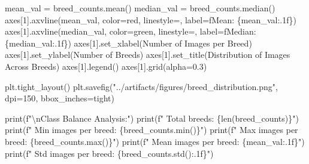 \documentclass[
  letterpaper,
  DIV=11,
  numbers=noendperiod]{scrartcl}
\newenvironment{Shaded}{\begin{snugshade}}{\end{snugshade}}
\newcommand{\BuiltInTok}[1]{\textcolor[rgb]{0.00,0.23,0.31}{#1}}
\newcommand{\CharTok}[1]{\textcolor[rgb]{0.13,0.47,0.30}{#1}}
\newcommand{\DecValTok}[1]{\textcolor[rgb]{0.68,0.00,0.00}{#1}}
\newcommand{\FloatTok}[1]{\textcolor[rgb]{0.68,0.00,0.00}{#1}}
\newcommand{\NormalTok}[1]{\textcolor[rgb]{0.00,0.23,0.31}{#1}}
\newcommand{\OperatorTok}[1]{\textcolor[rgb]{0.37,0.37,0.37}{#1}}
\newcommand{\SpecialCharTok}[1]{\textcolor[rgb]{0.37,0.37,0.37}{#1}}
\newcommand{\SpecialStringTok}[1]{\textcolor[rgb]{0.13,0.47,0.30}{#1}}
\newcommand{\StringTok}[1]{\textcolor[rgb]{0.13,0.47,0.30}{#1}}
\renewenvironment{Shaded}{%
  \begin{tcolorbox}[%
    enhanced,%
    colback=codebg,%
    colframe=codebg,%
    borderline west={3pt}{0pt}{sectionblue},%
    boxrule=0pt,%
    arc=0pt,%
    boxsep=5pt,%
    left=2mm,%
    right=2mm,%
    top=2mm,%
    bottom=2mm%
  ]%
}{%
  \end{tcolorbox}%
}
\begin{document}
\begin{Shaded}
\begin{Highlighting}[]
\NormalTok{mean\_val }\OperatorTok{=}\NormalTok{ breed\_counts.mean()}
\NormalTok{median\_val }\OperatorTok{=}\NormalTok{ breed\_counts.median()}
\NormalTok{axes[}\DecValTok{1}\NormalTok{].axvline(mean\_val, color}\OperatorTok{=}\StringTok{\textquotesingle{}red\textquotesingle{}}\NormalTok{, linestyle}\OperatorTok{=}\StringTok{\textquotesingle{}{-}{-}\textquotesingle{}}\NormalTok{,}
\NormalTok{                label}\OperatorTok{=}\SpecialStringTok{f\textquotesingle{}Mean: }\SpecialCharTok{\{}\NormalTok{mean\_val}\SpecialCharTok{:.1f\}}\SpecialStringTok{\textquotesingle{}}\NormalTok{)}
\NormalTok{axes[}\DecValTok{1}\NormalTok{].axvline(median\_val, color}\OperatorTok{=}\StringTok{\textquotesingle{}green\textquotesingle{}}\NormalTok{, linestyle}\OperatorTok{=}\StringTok{\textquotesingle{}{-}{-}\textquotesingle{}}\NormalTok{,}
\NormalTok{                label}\OperatorTok{=}\SpecialStringTok{f\textquotesingle{}Median: }\SpecialCharTok{\{}\NormalTok{median\_val}\SpecialCharTok{:.1f\}}\SpecialStringTok{\textquotesingle{}}\NormalTok{)}
\NormalTok{axes[}\DecValTok{1}\NormalTok{].set\_xlabel(}\StringTok{\textquotesingle{}Number of Images per Breed\textquotesingle{}}\NormalTok{)}
\NormalTok{axes[}\DecValTok{1}\NormalTok{].set\_ylabel(}\StringTok{\textquotesingle{}Number of Breeds\textquotesingle{}}\NormalTok{)}
\NormalTok{axes[}\DecValTok{1}\NormalTok{].set\_title(}\StringTok{\textquotesingle{}Distribution of Images Across Breeds\textquotesingle{}}\NormalTok{)}
\NormalTok{axes[}\DecValTok{1}\NormalTok{].legend()}
\NormalTok{axes[}\DecValTok{1}\NormalTok{].grid(alpha}\OperatorTok{=}\FloatTok{0.3}\NormalTok{)}

\NormalTok{plt.tight\_layout()}
\NormalTok{plt.savefig(}\StringTok{"../artifacts/figures/breed\_distribution.png"}\NormalTok{, }
\NormalTok{            dpi}\OperatorTok{=}\DecValTok{150}\NormalTok{, bbox\_inches}\OperatorTok{=}\StringTok{\textquotesingle{}tight\textquotesingle{}}\NormalTok{)}

\BuiltInTok{print}\NormalTok{(}\SpecialStringTok{f"}\CharTok{\textbackslash{}n}\SpecialStringTok{Class Balance Analysis:"}\NormalTok{)}
\BuiltInTok{print}\NormalTok{(}\SpecialStringTok{f"  Total breeds: }\SpecialCharTok{\{}\BuiltInTok{len}\NormalTok{(breed\_counts)}\SpecialCharTok{\}}\SpecialStringTok{"}\NormalTok{)}
\BuiltInTok{print}\NormalTok{(}\SpecialStringTok{f"  Min images per breed: }\SpecialCharTok{\{}\NormalTok{breed\_counts}\SpecialCharTok{.}\BuiltInTok{min}\NormalTok{()}\SpecialCharTok{\}}\SpecialStringTok{"}\NormalTok{)}
\BuiltInTok{print}\NormalTok{(}\SpecialStringTok{f"  Max images per breed: }\SpecialCharTok{\{}\NormalTok{breed\_counts}\SpecialCharTok{.}\BuiltInTok{max}\NormalTok{()}\SpecialCharTok{\}}\SpecialStringTok{"}\NormalTok{)}
\BuiltInTok{print}\NormalTok{(}\SpecialStringTok{f"  Mean images per breed: }\SpecialCharTok{\{}\NormalTok{mean\_val}\SpecialCharTok{:.1f\}}\SpecialStringTok{"}\NormalTok{)}
\BuiltInTok{print}\NormalTok{(}\SpecialStringTok{f"  Std images per breed: }\SpecialCharTok{\{}\NormalTok{breed\_counts}\SpecialCharTok{.}\NormalTok{std()}\SpecialCharTok{:.1f\}}\SpecialStringTok{"}\NormalTok{)}


\end{Highlighting}
\end{Shaded}
\end{document}
